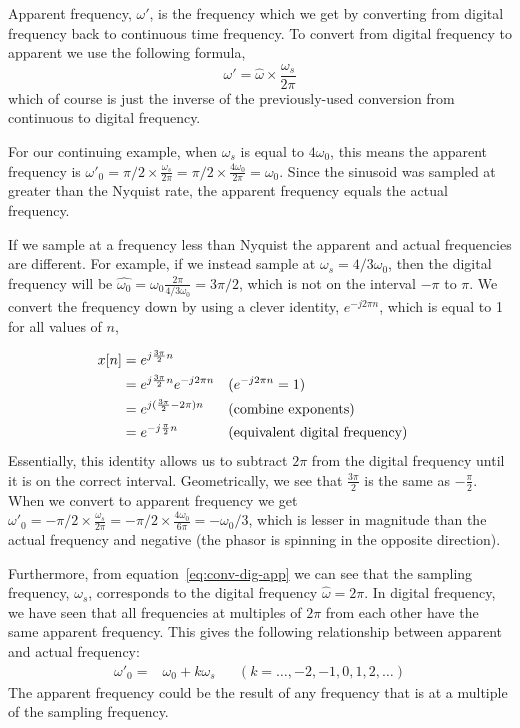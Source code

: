 Apparent frequency, $\omega'$, is the frequency which we get by
converting from digital frequency back to continuous time
frequency. To convert from digital frequency to apparent we use the
following formula,
\begin{equation}
\omega' = \hat{\omega}\times \frac{\omega_s}{2\pi} \label{eq:conv-dig-app}
\end{equation}
which of course is just the inverse of the previously-used conversion
from continuous to digital frequency.

For our continuing example, when $\omega_s$ is equal to $4\omega_0$,
this means the apparent frequency is $\omega'_0=\pi/2\times
\frac{\omega_s}{2\pi}=\pi/2\times
\frac{4\omega_0}{2\pi}=\omega_0$. Since the sinusoid was sampled at
greater than the Nyquist rate, the apparent frequency equals the
actual frequency.

If we sample at a frequency less than Nyquist the apparent and actual frequencies are different. For example, if we instead sample at $\omega_s=4/3\omega_0$, then the digital frequency will be $\hat{\omega_0}=\omega_0 \frac{2\pi}{4/3\omega_0}=3\pi/2$, which is not on the interval  $-\pi$ to $\pi$. We convert the frequency down by using a clever identity, $e^{-j2\pi n}$, which is equal to 1 for all values of $n$,

\begin{align}
x[n] & = e^{j \frac{3\pi}{2}n} \notag\\
  & = e^{j \frac{3\pi}{2}n} e^{-j2\pi n} && (e^{-j2\pi n}=1)\notag\\
  & = e^{j (\frac{3\pi}{2} -2\pi)n} && (\text{combine exponents})\notag\\
  & = e^{-j \frac{\pi}{2}n} && (\text{equivalent digital frequency}) \notag
\end{align}
%
Essentially, this identity allows us to subtract $2\pi$ from the
digital frequency until it is on the correct interval. Geometrically,
we see that $\frac{3\pi}{2}$ is the same as $-\frac{\pi}{2}$. When we
convert to apparent frequency we get $\omega'_0=-\pi/2\times
\frac{\omega_s}{2\pi}=-\pi/2\times
\frac{4\omega_0}{6\pi}=-\omega_0/3$, which is lesser in magnitude than
the actual frequency and negative (the phasor is spinning in the
opposite direction).

Furthermore, from equation~\ref{eq:conv-dig-app} we can see that the sampling frequency, $\omega_s$, corresponds to the digital frequency $\hat{\omega}=2\pi$. In digital frequency, we have seen that all frequencies at multiples of $2\pi$ from each other have the same apparent frequency. This gives the following relationship between apparent and actual frequency:
 \begin{align}
 \omega'_0 =&\omega_0 + k \omega_s && (k = \ldots, -2, -1, 0, 1, 2, \ldots)
 \end{align}
The apparent frequency could be the result of any frequency that is at a multiple of the sampling frequency. 

